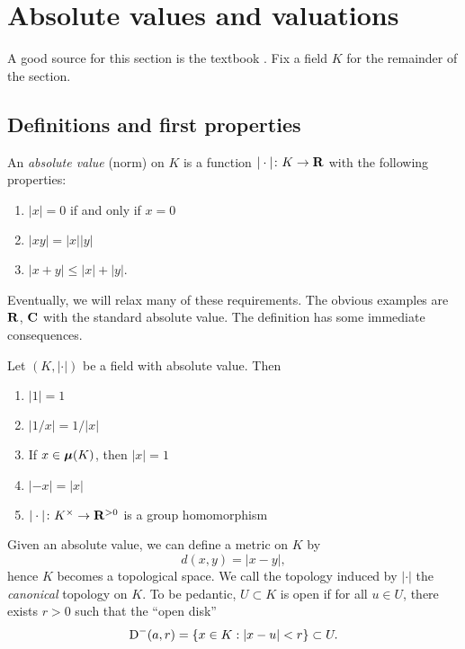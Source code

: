 





\section{Absolute values and valuations}

A good source for this section is the textbook \cite{engler-prestel}. 
Fix a field $K$ for the remainder of the section. 


\subsection{Definitions and first properties}

\begin{definition}
An \emph{absolute value} (norm) on $K$ is a function $|\cdot|\colon K\to \mathbf{R}$ 
with the following properties: 
\begin{enumerate}
\item
$|x|=0$ if and only if $x=0$

\item
$|xy|=|x| |y|$

\item $|x+y|\leqslant |x|+|y|$. 
\end{enumerate}
\end{definition}

Eventually, we will relax many of these requirements. The obvious examples 
are $\mathbf{R}$, $\mathbf{C}$ with the standard absolute value. The definition has some 
immediate consequences. 

\begin{lemma}
Let $(K,|\cdot|)$ be a field with absolute value. Then 
\begin{enumerate}
\item $|1|=1$
\item $|1/x|=1/|x|$
\item If $x\in {\bm\mu}(K)$, then $|x|=1$
\item $|-x|=|x|$
\item $|\cdot|\colon K^\times\to \mathbf{R}^{>0}$ is a group homomorphism
\end{enumerate}
\end{lemma}

Given an absolute value, we can define a metric on $K$ by 
\[
  d(x,y) = |x-y| ,
\]
hence $K$ becomes a topological space. We call the topology induced by 
$|\cdot|$ the \emph{canonical} topology on $K$. To be pedantic, $U\subset K$ 
is open if for all $u\in U$, there exists $r>0$ such that the ``open disk''
\[
  \operatorname{D}^-(a,r) = \{x\in K:|x-u|<r\}\subset U .
\]

